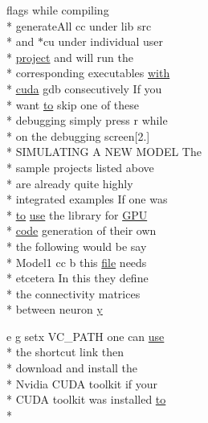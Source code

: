 \begin{DoxyCompactItemize}
flags while compiling \\*
generate\+All cc under lib src \\*
and $\ast$cu under individual user \\*
\hyperlink{userproject_2SynDelay__project_2README_8txt_a762c750134e07a31b7965860fd292b51}{project} and will run the \\*
corresponding executables \hyperlink{userproject_2OneComp__project_2README_8txt_ace09bb40fbf4457ad9a9340a67a4fa9a}{with} \\*
\hyperlink{README_8txt_a386e5818501e36b046e9cf9ee9a1a6b0}{cuda} gdb consecutively If you \\*
want \hyperlink{README_8txt_add1f2ee32acc15ef77f839d4382c9768}{to} skip one of these \\*
debugging simply press r while \\*
on the debugging screen\mbox{[}2.\mbox{]} \\*
S\+I\+M\+U\+L\+A\+T\+I\+N\+G A N\+E\+W M\+O\+D\+E\+L The \\*
sample projects listed above \\*
are already quite highly \\*
integrated examples If one was \\*
\hyperlink{README_8txt_add1f2ee32acc15ef77f839d4382c9768}{to} \hyperlink{README_8txt_acf386c48a14a2099c9220d6bcde40fc8}{use} the library for \hyperlink{modelSpec_8h_a39cb9803524b6f3b783344b2f89867b4}{G\+P\+U} \\*
\hyperlink{userproject_2MBody__userdef__project_2README_8txt_aeec4e596748e7c29dd5548dae4c70685}{code} generation of their own \\*
the following would be say \\*
Model1 cc b this \hyperlink{README_8txt_a6f45b2930c1b79b67034355b4701dc56}{file} needs \\*
etcetera In this they define \\*
the connectivity matrices \\*
between neuron \hyperlink{README_8txt_a920a9c177ac2efcc655675077d034047}{y}
\item 
e g setx V\+C\+\_\+\+P\+A\+T\+H one can \hyperlink{README_8txt_acf386c48a14a2099c9220d6bcde40fc8}{use} \\*
the shortcut link then \\*
download and install the \\*
Nvidia C\+U\+D\+A toolkit if your \\*
C\+U\+D\+A toolkit was installed \hyperlink{README_8txt_add1f2ee32acc15ef77f839d4382c9768}{to} \\*

\end{DoxyCompactItemize}
